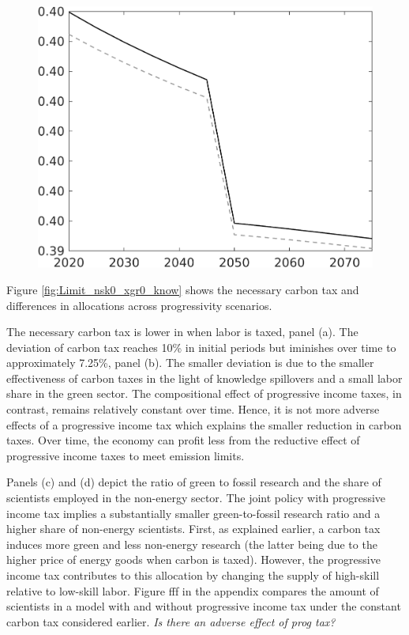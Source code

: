 \begin{figure}[h!!]
\begin{minipage}[]{0.32\textwidth}
\end{minipage}		
\begin{minipage}[]{0.32\textwidth}
\includegraphics[width=1\textwidth]{../../codding_model/own_basedOnFried/optimalPol_010922_revision/figures/all_13Sept22/CompTauf_bytaul_Reg0_EY_spillover0_nsk0_xgr0_knspil0_sep0_LFlimit1_emsbase0_countec0_GovRev0_etaa0.79_lgd0.png}
\end{minipage}	
 \end{figure} 
 
Figure \ref{fig:Limit_nsk0_xgr0_know} shows the necessary carbon tax and differences in allocations across progressivity scenarios. 

The necessary carbon tax is lower in when labor is taxed, panel (a). The deviation of carbon tax reaches 10\% in initial periods but iminishes over time to approximately 7.25\%, panel (b).
The smaller deviation is due to the smaller effectiveness of carbon taxes in the light of knowledge spillovers and a small labor share in the green sector. The compositional effect of progressive income taxes, in contrast, remains relatively constant over time. Hence, it is not more adverse effects of a progressive income tax which explains the smaller reduction in carbon taxes. Over time, the economy can profit less from the reductive effect of progressive income taxes to meet emission limits. 

Panels (c) and (d) depict the ratio of green to fossil research and the share of scientists employed in the non-energy sector. The joint policy with progressive income tax implies a substantially smaller green-to-fossil research ratio and a higher share of non-energy scientists. 
First, as explained earlier, a carbon tax induces more green and less non-energy research (the latter being due to the higher price of energy goods when carbon is taxed). However, the progressive income tax contributes to this allocation by changing the supply of high-skill relative to low-skill labor. Figure fff in the appendix compares the amount of scientists in a model with and without progressive income tax under the constant carbon tax considered earlier. \textit{Is there an adverse effect of prog tax? } 


